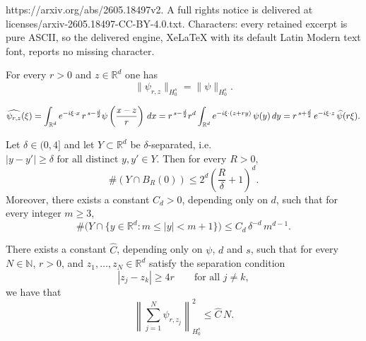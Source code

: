 \documentclass[10pt,a4paper]{amsart}
\newcommand{\Fhat}[1]{\widehat{#1}}
\newcommand{\N}{\mathbb{N}}
\newcommand{\R}{\mathbb{R}}
\newcommand{\dd}{\textup{d}}
\begin{document}
https://arxiv.org/abs/2605.18497v2. A full rights notice is delivered at licenses/arxiv-2605.18497-CC-BY-4.0.txt. Characters: every retained excerpt is pure ASCII, so the delivered engine, XeLaTeX with its default Latin Modern text font, reports no missing character.
\begin{lemma}\label{l:Hdots-scaling}
For every $r>0$ and $z\in\R^d$ one has
\begin{equation*}
\|\psi_{r,z}\|_{H_0^s}=\|\psi\|_{H_0^s}.
\end{equation*}
\end{lemma}

\begin{equation}\label{e:fourier per riscalata}
\Fhat{\psi_{r,z}}(\xi)
=\int_{\R^d} e^{-i\xi\cdot x}\,r^{\,s-\frac d2}\psi \left(\frac{x-z}{r}\right)\,\dd x
=r^{\,s-\frac d2}r^d \int_{\R^d} e^{-i\xi\cdot(z+r y)}\,\psi(y)\,\dd y
=r^{\,s+\frac d2}\,e^{-i\xi\cdot z}\,\Fhat{\psi}(r\xi).
\end{equation}

\begin{lemma}\label{l:conteggio}
Let $\delta\in (0,4]$ and let $Y\subset\R^d$ be $\delta$-separated, i.e. $
|y-y'|\ge \delta \text{ for all distinct }y,y'\in Y$.
Then for every $R>0$,
\begin{equation*}
\#(Y\cap B_R(0)) \le 2^d\left(\frac{R}{\delta}+1\right)^d.   \end{equation*}
Moreover, there exists a constant $C_d>0$, depending only on $d$, such that for every integer $m\geq 3$,
\begin{equation*}
\#\bigl(Y\cap\{y\in\R^d:m\le |y|<m+1\}\bigr)
\le C_d\,\delta^{-d}\,m^{d-1}.    
\end{equation*}
\end{lemma}

\begin{lemma}\label{l:almost-orth}
There exists a constant $\Fhat{C}$, depending only on $\psi$, $d$ and $s$, such that for every $N\in \N$, $r>0$, and $z_1,\dots,z_N\in\R^d$ satisfy the separation condition
\begin{equation}\label{e:separation}
|z_j-z_k|\ge 4r\qquad\text{for all }j\neq k,
\end{equation}
we have that
\begin{equation}\label{eq:almost-orth-bound}
\left\|\sum_{j=1}^N \psi_{r,z_j}\right\|_{H_0^s}^2 \le \Fhat{C}\,N.
\end{equation}
\end{lemma}
\end{document}
